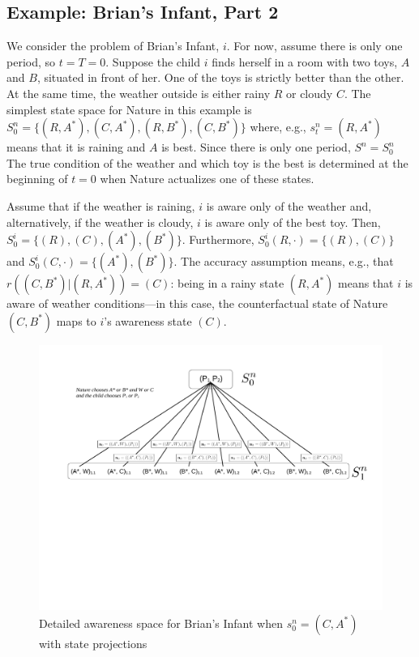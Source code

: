 \documentclass[
11pt,
titlepage,
reqno,
]{article}%
\theoremstyle{definition}
\begin{document}
\subsection{Example: Brian's Infant, Part 2}	
We consider the problem of Brian's Infant, $i$. 
For now, assume there is only one period, so $t=T=0$.  
Suppose the child $i$ finds herself in a room with two toys, $A$ and $B$, situated in front of her.  
One of the toys is strictly better than the other. At the same time, the weather outside is either rainy $R$ or cloudy $C$. 
The simplest state space for Nature in this example is $S^n_0=\{(R,A^\ast),(C,A^\ast),(R,B^\ast),(C,B^\ast)\}$ where, e.g., $s^n_t=(R,A^\ast)$ means that it is raining and $A$ is best. 
Since there is only one period, $S^n=S^n_0$ The true condition of the weather and which toy is the best is determined at the beginning of $t=0$ when Nature actualizes one of these states. 

Assume that if the weather is raining, $i$ is aware only of the weather and, alternatively, if the weather is cloudy, $i$ is aware only of the best toy. 
Then,  $S^i_0=\{(R),(C),(A^\ast),(B^\ast)\}$. 
Furthermore,  $S^i_0(R,\cdot)=\{(R),(C)\}$ and $S^i_0(C,\cdot)=\{(A^\ast),(B^\ast)\}$. 
The accuracy assumption means, e.g., that $r((C,B^\ast)|(R,A^\ast))=(C)$: being in a rainy state $(R,A^\ast)$ means that $i$ is aware of weather conditions---in this case, the counterfactual state of Nature $(C,B^\ast)$ maps to $i$'s awareness state $(C)$.

\begin{figure}[h!]
	\centering
	\includegraphics*[page=2,trim = 0in 3in 1.5in 0in,scale=.7]{Awareness_Diagrams_All}
	\caption{Detailed awareness space for Brian's Infant when $s^n_0=(C,A^\ast)$ with state projections\label{Diag: p-02}}%
\end{figure}
\end{document}
